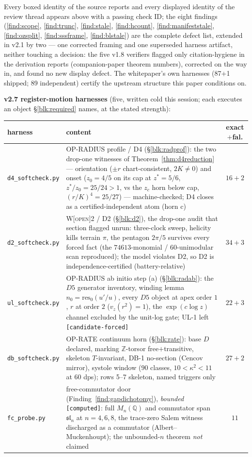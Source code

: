 \documentclass[11pt]{article}
\newcommand{\tagO}{\textcolor{cO}{\textsc{[open]}}}
\newcommand{\Q}{\mathbb{Q}}
\newcommand{\Z}{\mathbb{Z}}
\theoremstyle{plain}
\theoremstyle{definition}
\theoremstyle{remark}
\begin{document}
\smallskip\noindent
Every boxed identity of the source reports and every displayed identity of the
review thread appears above with a passing check ID; the eight findings
(\ref{find:scope}, \ref{find:trunc}, \ref{find:stale}, \ref{find:hcount},
\ref{find:manifeststale}, \ref{find:ozsplit}, \ref{find:sssframe},
\ref{find:blstale})
are the complete defect list, extended in v2.1 by two --- one corrected framing
and one superseded harness artifact, neither touching a decision: the five v1.8 verifiers
flagged only citation-hygiene in the derivation reports (companion-paper
theorem numbers), corrected on the way in, and found no new display defect. The
whitepaper's own harnesses (87$+$1 shipped; 89 independent) certify the upstream
structure this paper conditions on.

\smallskip\noindent
\textbf{v2.7 register-motion harnesses} (five, written cold this session; each
executes an object \S\ref{blk:required} names, at the stated strength):
\begin{center}\footnotesize\setlength{\tabcolsep}{4pt}
\begin{tabular}{@{}lp{10.2cm}c@{}}
\toprule
harness & content & exact$+$fal.\\
\midrule
\texttt{d4\_softcheck.py} & OP-RADIUS profile / D4 (\S\ref{blk:radprof}): the two drop-one witnesses of Theorem~\ref{thm:d4reduction} --- orientation ($\pm r$ chart-consistent, $2K\ne0$) and onset ($z_0{=}4/5$ on its cap at $z^\ast{=}5/6$, $z^\ast/z_0{=}25/24{>}1$, vs the $z_c$ horn below cap, $(r/K)^4{=}25/27$) --- machine-checked; D4 closes as a certified-independent atom (horn c) & $16{+}2$\\
\texttt{d2\_softcheck.py} & W\tagO{}2 / D2 (\S\ref{blk:d2}), the drop-one audit that section flagged unrun: three-clock sweep, helicity kills terrain $\pi$, the pentagon $2\pi/5$ survives every forced fact (the $74613$-monomial / $60$-unimodular scan reproduced); the model violates D2, so D2 is independence-certified (battery-relative) & $34{+}3$\\
\texttt{ul\_softcheck.py} & OP-RADIUS ab initio step (a) (\S\ref{blk:radab}): the $D5$ generator inventory, winding lemma $n_0{=}\mathrm{res}_0(u'/u)$, every $D5$ object at apex order $1$, $r$ at order $2$ ($v_z(r^2){=}1$), the $\exp(c\log z)$ channel excluded by the unit-log gate; \textsc{UL-1} left \texttt{[candidate-forced]} & $22{+}3$\\
\texttt{db\_softcheck.py} & OP-RATE continuum horn (\S\ref{blk:rate}): base $D$ declared, marking $\Z$-torsor free$+$transitive, skeleton $T$-invariant, \textsc{DB-1} no-section (Cencov mirror), systole window ($90$ classes, $10{<}\kappa^2{<}11$ at 60 dps); rows 5--7 skeleton, named triggers only & $27{+}2$\\
\texttt{fc\_probe.py} & free-commutator door (Finding~\ref{find:gapdichotomy}), \emph{bounded} \texttt{[computed]}: full $M_n(\Q)$ and commutator span $\mathfrak{sl}_n$ at $n{=}4,6,8$, the trace-zero Salem witness discharged as a commutator (Albert--Muckenhoupt); the unbounded-$n$ theorem \emph{not} claimed & $11$\\
\bottomrule
\end{tabular}
\end{center}
\end{document}
